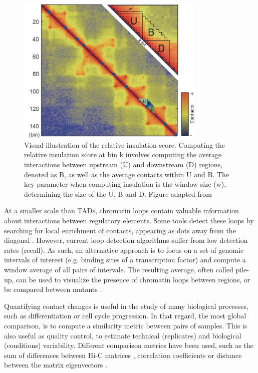 \begin{figure}[htb]
    \centering
    \includegraphics[width=0.8\textwidth]{Parts/Part01/gfx/insulation_score_hicdb.pdf}
    \caption[Visual illustration of the relative insulation score.]{Visual illustration of the relative insulation score. Computing the relative insulation score at bin k involves computing the average interactions between upstream (U) and downstream (D) regions, denoted as B, as well as the average contacts within U and B. The key parameter when computing insulation is the window size (w), determining the size of the U, B and D. Figure adapted from \cite{chenHiCDBSensitiveRobust2018}}
    \label{fig:01-02:insulation}
\end{figure}


At a smaller scale than \acrshort{TAD}s, chromatin loops contain valuable information about interactions between regulatory elements. Some tools detect these loops by searching for local enrichment of contacts, appearing as dots away from the diagonal \citep{durandJuiceboxProvidesVisualization2016,ramirezHighresolutionTADsReveal2018}. However, current loop detection algorithms suffer from low detection rates (recall). As such, an alternative approach is to focus on a set of genomic intervals of interest (e.g. binding sites of a transcription factor) and compute a window average of all pairs of intervals. The resulting average, often called pile-up, can be used to visualize the presence of chromatin loops between regions, or be compared between mutants \cite{flyamerCoolpupPyVersatile2020}.

Quantifying contact changes is useful in the study of many biological processes, such as differentiation or cell cycle progression. In that regard, the most global comparison, is to compute a similarity metric between pairs of samples. This is also useful as quality control, to estimate technical (replicates) and biological (conditions) variability. Different comparison metrics have been used, such as the sum of differences between Hi-C matrices \cite{ursuGenomeDISCOConcordanceScore2018}, correlation coefficients \cite{yangHiCRepAssessingReproducibility} or distance between the matrix eigenvectors \cite{yanHiCspectorMatrixLibrary2017}.


